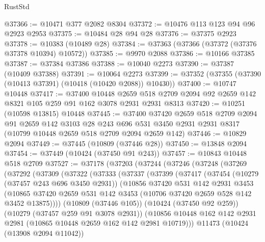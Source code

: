 \begin{lexlean}{RustStd}
\begin{coremodule}
@37366 := @10471 @377 @2082 @8304
@37372 := @10476 @113 @123 @94 @96 @2923 @2953
@37375 := @10484 @28 @94 @28
@37376 := @37375 @2923
@37378 := @10383 (@10489 @28)
@37384 := @37363 (@37366 (@37372 (@37376 @37378 @10394) @10572))
@37385 := @9970 @2088
@37386 := @10166 @37385
@37387 := @37384 @37386
@37388 := @10040 @2273
@37390 := @37387 (@10409 @37388)
@37391 := @10064 @2273
@37399 := @37352 (@37355 (@37390 (@10413 @37391) (@10418 (@10420 @2088)) @10430))
@37400 := @10747 @10448
@37417 := @37400
    @10448
    @2659
    @518
    @2709
    @2094
    @92
    @2659
    @142
    @8321
    @105
    @259
    @91
    @162
    @3078
    @2931
    @2931
    @8313
@37420 := @10251 (@10598 @13815) @10448
@37445 := @37400
    @37420
    @2659
    @518
    @2709
    @2094
    @91
    @2659
    @142
    @3103
    @28
    @243
    @696
    @531
    @3450
    @2931
    @2931
    @8317
    (@10799 @10448 @2659 @518 @2709 @2094 @2659 @142)
@37446 := @10829 @2094
@37449 := @37445 (@10809 (@37446 @28))
@37450 := @13848 @2094
@37454 := @37449 (@10424 (@37450 @91 @243))
@37457 := @10843 @10448 @518 @2709
@37527 := @37178
    (@37203
      (@37244
        (@37246
          (@37248
            (@37269
              (@37292
                (@37309
                  (@37322
                    (@37333
                      (@37337
                        (@37399
                          (@37417
                            (@37454
                              (@10279 (@37457 @243 @696 @3450 @2931))
                              (@10856
                                @37420
                                @531
                                @142
                                @2931
                                @3453
                                (@10865
                                  @37420
                                  @2659
                                  @531
                                  @142
                                  @3453
                                  (@10706 @37420 @2659 @528 @142 @3452 @13875))))
                            (@10809 (@37446 @105))
                            (@10424 (@37450 @92 @259))
                            (@10279 (@37457 @259 @91 @3078 @2931))
                            (@10856
                              @10448
                              @162
                              @142
                              @2931
                              @2981
                              (@10865 @10448 @2659 @162 @142 @2981 @10719)))
                          @11473
                          (@10424 (@13908 @2094 @11042))

\end{coremodule}
\end{lexlean}
